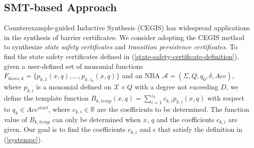 \documentclass[acmlarge]{acmart}
\begin{document}
\subsection{SMT-based Approach}
Counterexample-guided Inductive Synthesis (CEGIS) \cite{solar2008program} has widespread applications in the synthesis of barrier certificates. We consider adopting the CEGIS method to synthesize \emph{state safety certificates} and \emph{transition persistence certificates}. To find the state safety certificates defined in (\ref{state-safety-certificate-definition}), given a user-defined set of monomial functions $F_{basis, k} = \{p_{k,1}(x, q), \dots, p_{k,z_k}(x,q)\}$ and an NBA $\mathcal{A} = (\Sigma, Q, q_0, \delta, Acc)$, where $p_{k, i}$ is a monomial defined on $\mathcal{X} \times Q$ with a degree not exceeding $D$, we define the template function $B_{k, temp}(x, q) = \sum_{i=1}^{z_k} c_{k, i} p_{k, i}(x, q)$ with respect to $q_k \in Acc^{start}$, where $c_{k,i} \in \mathbb{R}$ are the coefficients to be determined. The function value of $B_{k, temp}$ can only be determined when $x$, $q$ and the coefficients $c_{k, i}$ are given. Our goal is to find the coefficients $c_{k, i}$ and $\epsilon$ that satisfy the definition in (\ref{systempc}).
\end{document}
